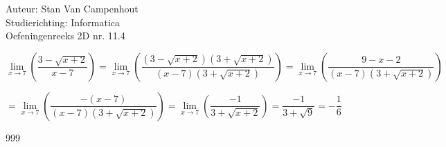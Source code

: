 \documentclass[a4paper]{article}
\begin{document}
  
\noindent \large Auteur: Stan Van Campenhout \\
\noindent \large Studierichting:  Informatica\\
\noindent \large Oefeningenreeks 2D nr. 11.4\\

\medskip

\normalsize

$ \lim\limits_{x \rightarrow 7} \left(\dfrac{3 - \sqrt{x + 2}}{x - 7} \right) 
= \lim\limits_{x \rightarrow 7} \left(\dfrac{(3 - \sqrt{x + 2})(3 + \sqrt{x + 2})}{(x - 7)(3 + \sqrt{x + 2})} \right) 
= \lim\limits_{x \rightarrow 7} \left(\dfrac{9 - x - 2}{(x - 7)(3 + \sqrt{x + 2})} \right) $\\

\medskip

$ = \lim\limits_{x \rightarrow 7} \left(\dfrac{-(x - 7)}{(x - 7)(3 + \sqrt{x + 2})} \right) 
= \lim\limits_{x \rightarrow 7} \left(\dfrac{-1}{3 + \sqrt{x + 2}} \right) =\dfrac{-1}{3 + \sqrt{9}} = -\dfrac{1}{6} $\\

\begin{thebibliography}{999}
\end{thebibliography}
\end{document}
